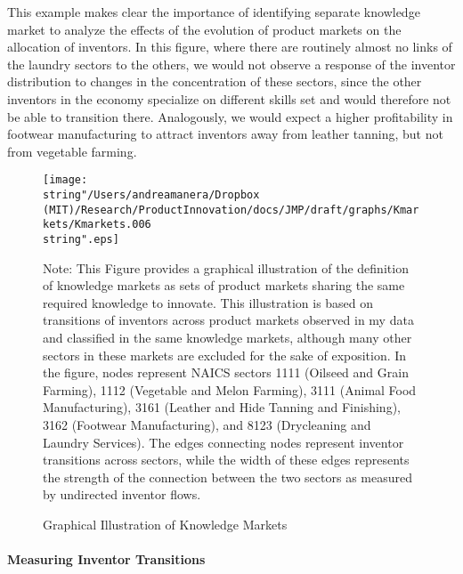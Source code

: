 This example makes clear the importance of identifying separate knowledge
market to analyze the effects of the evolution of product markets
on the allocation of inventors. In this figure, where there are routinely
almost no links of the laundry sectors to the others, we would not
observe a response of the inventor distribution to changes in the
concentration of these sectors, since the other inventors in the economy
specialize on different skills set and would therefore not be able
to transition there. Analogously, we would expect a higher profitability
in footwear manufacturing to attract inventors away from leather tanning,
but not from vegetable farming. 

\begin{figure}[t]
\caption{Graphical Illustration of Knowledge Markets}
\label{fig: KmarketGraph}
\begin{centering}
\texttt{[image: \\string"/Users/andreamanera/Dropbox (MIT)/Research/ProductInnovation/docs/JMP/draft/graphs/Kmarkets/Kmarkets.006\\string".eps]}\\
\par\end{centering}
{\footnotesize{}Note: This Figure provides a graphical illustration
of the definition of knowledge markets as sets of product markets
sharing the same required knowledge to innovate. This illustration
is based on transitions of inventors across product markets observed
in my data and classified in the same knowledge markets, although
many other sectors in these markets are excluded for the sake of exposition.
In the figure, nodes represent NAICS sectors 1111 (Oilseed and Grain
Farming), 1112 (Vegetable and Melon Farming), 3111 (Animal Food Manufacturing),
3161 (Leather and Hide Tanning and Finishing), 3162 (Footwear Manufacturing),
and 8123 (Drycleaning and Laundry Services). The edges connecting
nodes represent inventor transitions across sectors, while the width
of these edges represents the strength of the connection between the
two sectors as measured by undirected inventor flows.}{\footnotesize\par}
\end{figure}


\paragraph{Measuring Inventor Transitions}

